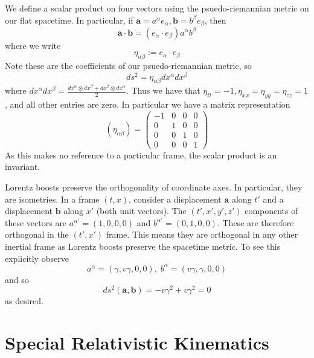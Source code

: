 We define a scalar product on four vectors using the psuedo-riemannian metric on our flat spacetime. In particular, if $\mathbf{a} = a^{\alpha}e_{\alpha},\mathbf{b} = b^{\beta}e_{\beta}$, then $$\mathbf{a}\cdot\mathbf{b} = (e_{\alpha}\cdot e_{\beta})a^{\alpha}b^{\beta}$$
where we write $$\eta_{\alpha\beta} := e_{\alpha}\cdot e_{\beta}$$
Note these are the coefficients of our psuedo-riemannian metric, so $$ds^2 = \eta_{\alpha\beta}dx^{\alpha}dx^{\beta}$$
where $dx^{\alpha}dx^{\beta} = \frac{dx^{\alpha}\otimes dx^{\beta}+dx^{\beta}\otimes dx^{\alpha}}{2}$. Thus we have that $\eta_{tt} = -1,\eta_{xx} = \eta_{yy}=\eta_{zz} = 1$, and all other entries are zero. In particular we have a matrix representation $$(\eta_{\alpha\beta}) = \begin{pmatrix} -1 & 0 & 0 & 0 \\ 0 & 1 & 0 & 0 \\ 0 & 0 & 1 & 0 \\ 0 & 0 & 0 & 1\end{pmatrix}$$
As this makes no reference to a particular frame, the scalar product is an invariant.

\begin{eg}
    Lorentz boosts preserve the orthogonality of coordinate axes. In particular, they are isometries. In a frame $(t,x)$, consider a displacement $\mathbf{a}$ along $t'$ and a displacement $\mathbf{b}$ along $x'$ (both unit vectors). The $(t',x',y',z')$ components of these vectors are $a^{\alpha'} = (1,0,0,0)$ and $b^{\alpha'} = (0,1,0,0)$. These are therefore orthogonal in the $(t',x')$ frame. This means they are orthogonal in any other inertial frame as Lorentz boosts preserve the spacetime metric. To see this explicitly observe $$a^{\alpha} = (\gamma,v\gamma,0,0),\;b^{\alpha} = (v\gamma,\gamma,0,0)$$
    and so $$ds^2(\mathbf{a},\mathbf{b}) = -v\gamma^2+v\gamma^2 = 0$$
    as desired.
\end{eg}



\section{Special Relativistic Kinematics}
\label{sec:SpecRelKin}

